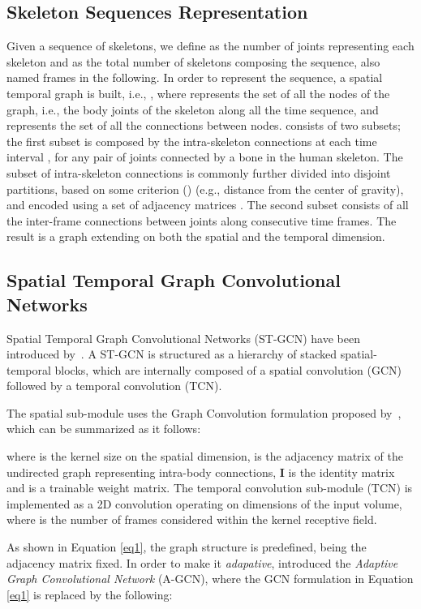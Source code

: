 \documentclass[times,twocolumn,final,authoryear]{elsarticle}
\begin{document}
\subsection{Skeleton Sequences Representation}

Given a sequence of skeletons, we define  as the number of joints representing each skeleton and  as the total number of skeletons composing the sequence, also named frames in the following.
In order to represent the sequence, a spatial temporal graph is built, i.e., , where  represents the set of all the nodes  of the graph, i.e., the body joints of the skeleton along all the time sequence, and  represents the set of all the connections between nodes.  consists of two subsets; the first subset  is composed by the intra-skeleton connections at each time interval , for any pair of joints  connected by a bone in the human skeleton. The subset  of intra-skeleton connections is commonly further divided into  disjoint partitions, based on some criterion (\cite{yan2018spatial}) (e.g., distance from the center of gravity), and encoded using a set of adjacency matrices . The second subset  consists of all the inter-frame connections between joints along consecutive time frames. The result is a graph extending on both the spatial and the temporal dimension.


\subsection{Spatial Temporal Graph Convolutional Networks}\label{st-gcn}

Spatial Temporal Graph Convolutional Networks (ST-GCN) have been introduced by~\cite{yan2018spatial}. A ST-GCN is structured as a hierarchy of stacked spatial-temporal blocks, which are internally composed of a spatial convolution (GCN) followed by a temporal convolution (TCN). 

The spatial sub-module uses the Graph Convolution formulation proposed by~\cite{Kipf:2016tc}, which can be summarized as it follows:

where  is the kernel size on the spatial dimension,  is the adjacency matrix of the undirected graph representing intra-body connections, \textbf{I} is the identity matrix and  is a trainable weight matrix. The temporal convolution sub-module (TCN) is implemented as a  2D convolution operating on  dimensions of the  input volume, where  is the number of frames considered within the kernel receptive field. 

As shown in Equation \ref{eq1}, the graph structure is predefined, being the adjacency matrix fixed. In order to make it \textit{adapative}, \cite{Shi2018TwoStreamAG} introduced the \textit{Adaptive Graph Convolutional Network} (A-GCN), where the GCN formulation in Equation \ref{eq1} is replaced by the following:
\end{document}
